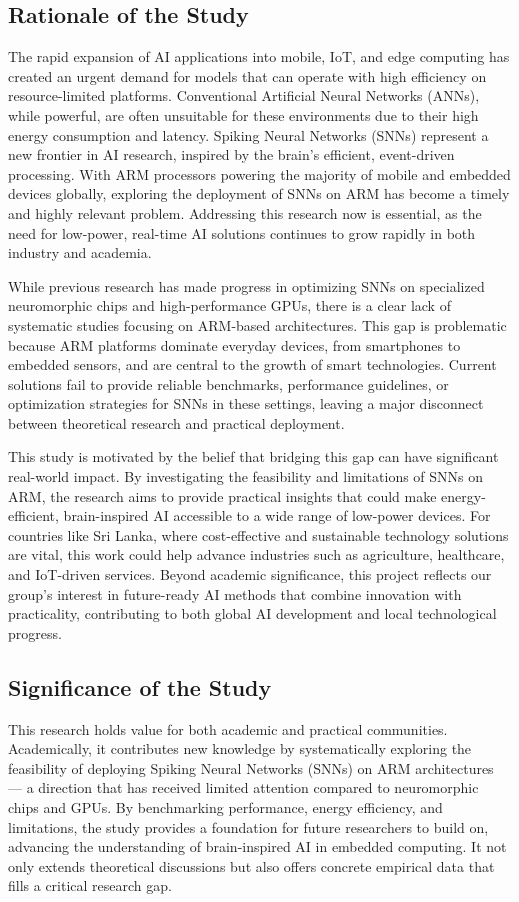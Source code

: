 \subsection{Rationale of the Study}
The rapid expansion of AI applications into mobile, IoT, and edge computing has created an urgent demand for models that can operate with high efficiency on resource-limited platforms. Conventional Artificial Neural Networks (ANNs), while powerful, are often unsuitable for these environments due to their high energy consumption and latency. Spiking Neural Networks (SNNs) represent a new frontier in AI research, inspired by the brain’s efficient, event-driven processing. With ARM processors powering the majority of mobile and embedded devices globally, exploring the deployment of SNNs on ARM has become a timely and highly relevant problem. Addressing this research now is essential, as the need for low-power, real-time AI solutions continues to grow rapidly in both industry and academia.

While previous research has made progress in optimizing SNNs on specialized neuromorphic chips and high-performance GPUs, there is a clear lack of systematic studies focusing on ARM-based architectures. This gap is problematic because ARM platforms dominate everyday devices, from smartphones to embedded sensors, and are central to the growth of smart technologies. Current solutions fail to provide reliable benchmarks, performance guidelines, or optimization strategies for SNNs in these settings, leaving a major disconnect between theoretical research and practical deployment.

This study is motivated by the belief that bridging this gap can have significant real-world impact. By investigating the feasibility and limitations of SNNs on ARM, the research aims to provide practical insights that could make energy-efficient, brain-inspired AI accessible to a wide range of low-power devices. For countries like Sri Lanka, where cost-effective and sustainable technology solutions are vital, this work could help advance industries such as agriculture, healthcare, and IoT-driven services. Beyond academic significance, this project reflects our group’s interest in future-ready AI methods that combine innovation with practicality, contributing to both global AI development and local technological progress.


\subsection{Significance of the Study}
This research holds value for both academic and practical communities. Academically, it contributes new knowledge by systematically exploring the feasibility of deploying Spiking Neural Networks (SNNs) on ARM architectures — a direction that has received limited attention compared to neuromorphic chips and GPUs. By benchmarking performance, energy efficiency, and limitations, the study provides a foundation for future researchers to build on, advancing the understanding of brain-inspired AI in embedded computing. It not only extends theoretical discussions but also offers concrete empirical data that fills a critical research gap.

